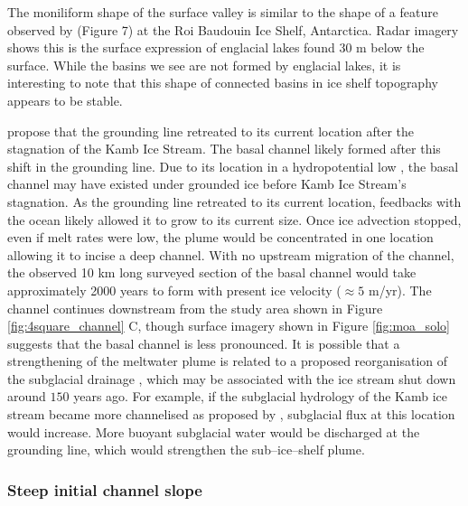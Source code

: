 The moniliform shape of the surface valley is similar to the shape of a feature observed by \cite{berger2017detecting} (Figure 7) at the Roi Baudouin Ice Shelf, Antarctica. Radar imagery shows this is the surface expression of englacial lakes found 30 m below the surface. While the basins we see are not formed by englacial lakes, it is interesting to note that this shape of connected basins in ice shelf topography appears to be stable. 

\cite{horgan2017poststagnation} propose that the grounding line retreated to its current location after the stagnation of the Kamb Ice Stream. The basal channel likely formed after this shift in the grounding line. 
Due to its location in a hydropotential low \citep{le2009subglacial}, the basal channel may have existed under grounded ice before Kamb Ice Stream's stagnation. As the grounding line retreated to its current location, feedbacks with the ocean likely allowed it to grow to its current size. Once ice advection stopped, even if  melt rates were low, the plume would be concentrated in one location allowing it to incise a deep channel. With no upstream migration of the channel, the observed 10 km long surveyed section of the basal channel would take approximately 2000 years to form with present ice velocity ($\approx 5$ m/yr). The channel continues downstream from the study area shown in Figure \ref{fig:4square_channel} C, though surface imagery shown in Figure \ref{fig:moa_solo} suggests that the basal channel is less pronounced.
It is possible that a strengthening of the meltwater plume is related to a proposed reorganisation of the subglacial drainage \cite [e.g.][] {anandakrishnan1997stagnation}, which may be associated with the ice stream shut down around $150$ years ago. For example, if the subglacial hydrology of the Kamb ice stream became more channelised as proposed by \cite{lelandais2018modelled}, subglacial flux at this location would increase. More buoyant subglacial water would be discharged at the grounding line, which would strengthen the sub--ice--shelf plume.  


\subsubsection{Steep initial channel slope} \label{sec:steep}

